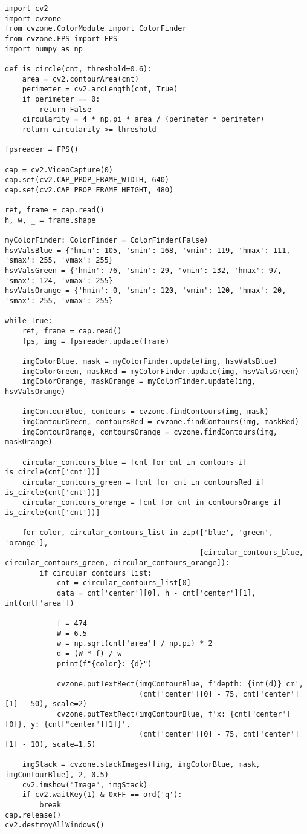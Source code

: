 \begin{lstlisting}[language=PythonPlus]
import cv2
import cvzone
from cvzone.ColorModule import ColorFinder
from cvzone.FPS import FPS
import numpy as np

def is_circle(cnt, threshold=0.6):
    area = cv2.contourArea(cnt)
    perimeter = cv2.arcLength(cnt, True)
    if perimeter == 0:
        return False
    circularity = 4 * np.pi * area / (perimeter * perimeter)
    return circularity >= threshold

fpsreader = FPS()

cap = cv2.VideoCapture(0)
cap.set(cv2.CAP_PROP_FRAME_WIDTH, 640)
cap.set(cv2.CAP_PROP_FRAME_HEIGHT, 480)

ret, frame = cap.read()
h, w, _ = frame.shape

myColorFinder: ColorFinder = ColorFinder(False)
hsvValsBlue = {'hmin': 105, 'smin': 168, 'vmin': 119, 'hmax': 111, 'smax': 255, 'vmax': 255} 
hsvValsGreen = {'hmin': 76, 'smin': 29, 'vmin': 132, 'hmax': 97, 'smax': 124, 'vmax': 255} 
hsvValsOrange = {'hmin': 0, 'smin': 120, 'vmin': 120, 'hmax': 20, 'smax': 255, 'vmax': 255} 

while True:
    ret, frame = cap.read()  
    fps, img = fpsreader.update(frame)  

    imgColorBlue, mask = myColorFinder.update(img, hsvValsBlue)  
    imgColorGreen, maskRed = myColorFinder.update(img, hsvValsGreen) 
    imgColorOrange, maskOrange = myColorFinder.update(img, hsvValsOrange)  

    imgContourBlue, contours = cvzone.findContours(img, mask)  
    imgContourGreen, contoursRed = cvzone.findContours(img, maskRed)  
    imgContourOrange, contoursOrange = cvzone.findContours(img, maskOrange)

    circular_contours_blue = [cnt for cnt in contours if is_circle(cnt['cnt'])]
    circular_contours_green = [cnt for cnt in contoursRed if is_circle(cnt['cnt'])]
    circular_contours_orange = [cnt for cnt in contoursOrange if is_circle(cnt['cnt'])]

    for color, circular_contours_list in zip(['blue', 'green', 'orange'],
                                             [circular_contours_blue, circular_contours_green, circular_contours_orange]):
        if circular_contours_list:
            cnt = circular_contours_list[0]
            data = cnt['center'][0], h - cnt['center'][1], int(cnt['area'])

            f = 474
            W = 6.5
            w = np.sqrt(cnt['area'] / np.pi) * 2
            d = (W * f) / w
            print(f"{color}: {d}")

            cvzone.putTextRect(imgContourBlue, f'depth: {int(d)} cm',
                               (cnt['center'][0] - 75, cnt['center'][1] - 50), scale=2)
            cvzone.putTextRect(imgContourBlue, f'x: {cnt["center"][0]}, y: {cnt["center"][1]}',
                               (cnt['center'][0] - 75, cnt['center'][1] - 10), scale=1.5)

    imgStack = cvzone.stackImages([img, imgColorBlue, mask, imgContourBlue], 2, 0.5)
    cv2.imshow("Image", imgStack)
    if cv2.waitKey(1) & 0xFF == ord('q'):
        break
cap.release()
cv2.destroyAllWindows()
\end{lstlisting}